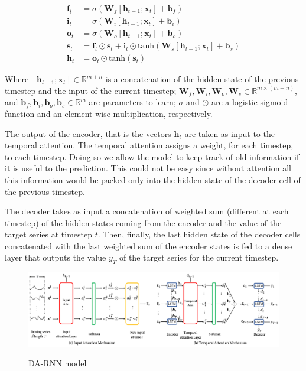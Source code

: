 \documentclass{article}
\begin{document}
\begin{equation} \label{eq:lstm}
\begin{split}
\mathbf{f}_t &= \sigma (\mathbf{W}_f[\mathbf{h}_{t-1};\mathbf{x}_t] +
\mathbf{b}_f) \\
\mathbf{i}_t &= \sigma (\mathbf{W}_i[\mathbf{h}_{t-1};\mathbf{x}_t] +
\mathbf{b}_i) \\
\mathbf{o}_t &= \sigma (\mathbf{W}_o[\mathbf{h}_{t-1};\mathbf{x}_t] +
\mathbf{b}_o) \\
\mathbf{s}_t &= \mathbf{f}_t \odot \mathbf{s}_t + \mathbf{i}_t 
				\odot
\text{tanh}(\mathbf{W}_s[\mathbf{h}_{t-1};\mathbf{x}_t] + \mathbf{b}_s) \\
\mathbf{h}_t &= \mathbf{o}_t \odot \text{tanh}(\mathbf{s}_t)
\end{split}
\end{equation}

Where $[\mathbf{h}_{t-1};\mathbf{x}_t] \in \mathbb{R}^{m + n}$ is a
concatenation of the hidden state of the previous
timestep and the input of the current timestep;
$\mathbf{W}_f,\mathbf{W}_i,\mathbf{W}_o,\mathbf{W}_s
\in \mathbb{R}^{m \times(m+n)}$, and $\mathbf{b}_f, \mathbf{b}_i,
\mathbf{b}_o,\mathbf{b}_s \in \mathbb{R}^m$ are
parameters to learn; $\sigma$ and $\odot$ are a logistic sigmoid function and
an element-wise multiplication,
respectively.

The output of the encoder, that is the vectors $\mathbf{h}_t$ are taken as
input to the temporal attention.
The temporal attention assigns a weight, for each timestep, to each timestep.
Doing so we allow the model to keep
track of old information if it is useful to the prediction. This could not be
easy since without attention all this
information would be packed only into the hidden state of the decoder cell of
the previous timestep.

The decoder takes as input a concatenation of weighted sum (different at each
timestep) of the hidden states coming
from the encoder and the value of the target series at timestep $t$. Then,
finally, the last hidden state of the decoder
cells concatenated with the last weighted sum of the encoder states is fed to a
dense layer that outputs the value
$y_T$ of the target series for the current timestep.

\begin{figure}[ht]
\centering
\includegraphics[width=\linewidth]{img/da-rnn.png} \\
\caption{DA-RNN model}
\label{fig:da-rnn}
\end{figure}
\end{document}
